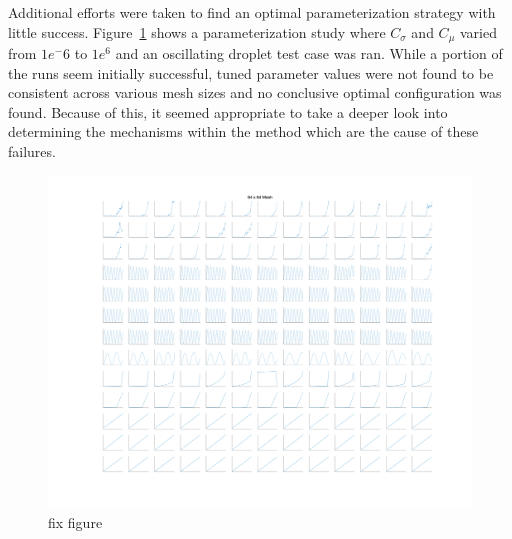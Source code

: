 Additional efforts were taken to  find an optimal parameterization strategy with little success. Figure~\ref{fig:para} shows a parameterization study where $C_{\sigma}$ and $C_{\mu}$ varied from $1e^-6$ to $1e^6$ and an oscillating droplet test case was ran. While a portion of the runs seem initially successful, tuned parameter values were not found to be consistent across various mesh sizes and no conclusive optimal configuration was found. Because of this, it seemed appropriate to take a deeper look into determining the mechanisms within the method which are the cause of these failures. 
\begin{figure}
	\centering
	\includegraphics[width=1.0\textwidth]{figs/para}
	\caption{fix figure}
	\label{fig:para}
\end{figure}






